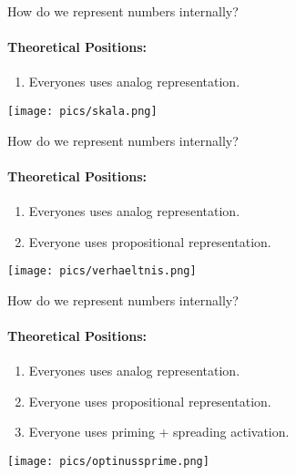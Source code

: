 \documentclass[ignorenonframetext,t]{beamer}
\providecommand{\tightlist}{%
  \setlength{\itemsep}{0pt}\setlength{\parskip}{0pt}}
\begin{document}
\begin{frame}{How do we represent numbers internally?}

\framesubtitle{Theoretical Positions:}

\vspace*{.3cm}

\begin{enumerate}
\def\labelenumi{\arabic{enumi}.}
\tightlist
\item
  Everyones uses analog representation.
\end{enumerate}

\vspace*{.7cm}

\centering \texttt{[image: pics/skala.png]}

\end{frame}

\begin{frame}{How do we represent numbers internally?}

\framesubtitle{Theoretical Positions:}

\vspace*{.3cm}

\begin{enumerate}
\def\labelenumi{\arabic{enumi}.}
\tightlist
\item
  Everyones uses analog representation.
\item
  Everyone uses propositional representation.
\end{enumerate}

\vspace*{.4cm}

\centering \texttt{[image: pics/verhaeltnis.png]}

\end{frame}

\begin{frame}{How do we represent numbers internally?}

\framesubtitle{Theoretical Positions:}

\vspace*{.3cm}

\begin{enumerate}
\def\labelenumi{\arabic{enumi}.}
\tightlist
\item
  Everyones uses analog representation.
\item
  Everyone uses propositional representation.
\item
  Everyone uses priming + spreading activation.
\end{enumerate}

\vspace*{.2cm}

\centering \texttt{[image: pics/optinussprime.png]}

\end{frame}
\end{document}
